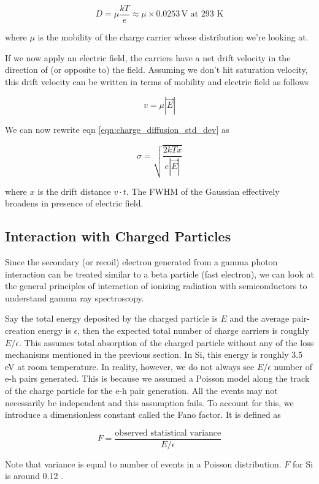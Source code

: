 \documentclass{article}
\begin{document}
\[D= \mu \frac{kT}{e} \approx \mu \times 0.0253 \, \text{V        at 293 K} \]


where $\mu$ is the mobility of the charge carrier whose distribution we're looking at. 

If we now apply an electric field, the carriers have a net drift velocity in the direction of (or opposite to) the field. 
Assuming we don't hit saturation velocity, this drift velocity can be written in terms of mobility and electric field as follows

\[v = \mu |\vec{E}|\]

We can now rewrite eqn \ref{eqn:charge_diffusion_std_dev} as 

\[\sigma = \sqrt{\frac{2kT x}{e |\vec{E}|}}\]

where $x$ is the drift distance $v\cdot t$. The FWHM of the Gaussian effectively broadens in presence of electric field. 

\subsection{Interaction with Charged Particles}

Since the secondary (or recoil) electron generated from a gamma photon interaction can be treated similar to a beta particle (fast electron), we can look at the general principles 
of interaction of ionizing radiation with semiconductors to understand gamma ray spectroscopy. 

Say the total energy deposited by the charged particle is $E$ and the average pair-creation energy is $\epsilon$, then the expected total number of charge carriers is roughly 
$E/\epsilon$. This assumes total absorption of the charged particle without any of the loss mechanisms mentioned in the previous section. In Si, this energy is roughly 3.5 eV at room temperature. 
In reality, however, we do not always see $E/\epsilon$ number of e-h pairs generated. This is because we assumed a Poisson model along the track of the charge particle for the e-h pair generation.
All the events may not necessarily be independent and this assumption fails. To account for this, we introduce a dimensionless constant called the Fano factor. It is defined as 

\begin{equation}
    F = \frac{\text{observed statistical variance}}{E/\epsilon}
\end{equation}

Note that variance is equal to number of events in a Poisson distribution. $F$ for Si is around 0.12 \cite{Knoll2000}.
\end{document}
